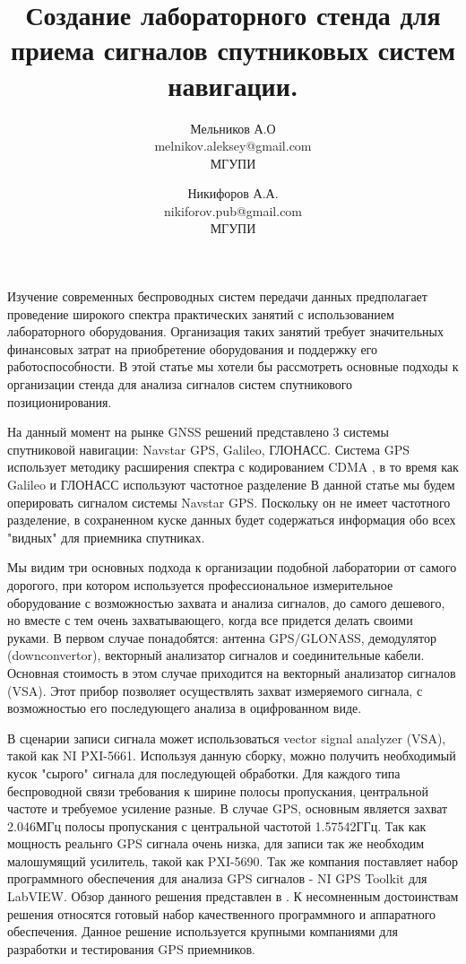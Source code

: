 \documentclass[a4paper,12pt]{article}
\numberwithin{table}{section}
\begin{document}
\title{Создание лабораторного стенда для приема сигналов спутниковых систем навигации.}
\author{Мельников А.О\\ melnikov.aleksey@gmail.com\\ МГУПИ \and Никифоров А.А.\\nikiforov.pub@gmail.com\\ МГУПИ}

\maketitle

Изучение современных беспроводных систем передачи данных предполагает проведение широкого спектра практических занятий с использованием лабораторного
оборудования.
Организация таких занятий требует значительных финансовых затрат на приобретение оборудования и поддержку его работоспособности. В этой статье мы хотели бы
рассмотреть основные подходы к организации стенда для анализа сигналов систем спутникового позиционирования.

На данный момент на рынке GNSS решений представлено 3 системы спутниковой навигации: Navstar GPS, Galileo, ГЛОНАСС. Система GPS использует методику
расширения спектра с кодированием CDMA \cite{gpsuserequipment}, в то время как Galileo и ГЛОНАСС используют частотное разделение \cite{galileo}
В данной статье мы будем оперировать
сигналом системы Navstar GPS. Поскольку он не имеет частотного разделение, в сохраненном куске данных будет содержаться информация обо всех "видных"
для приемника спутниках.
 
Мы видим три основных подхода к организации подобной лаборатории от самого дорогого, при котором используется профессиональное измерительное
оборудование с возможностью
захвата и анализа сигналов, до самого дешевого, но вместе с тем очень захватывающего, когда все придется делать своими руками.
В первом случае понадобятся: антенна GPS/GLONASS, демодулятор (downconvertor),
векторный анализатор сигналов и соединительные кабели. Основная стоимость в этом случае приходится на векторный анализатор сигналов (VSA).
Этот прибор позволяет осуществлять захват измеряемого сигнала, с возможностью его последующего анализа в оцифрованном виде.

В сценарии записи сигнала может использоваться vector signal analyzer (VSA), такой как NI PXI-5661.
Используя данную сборку, можно получить необходимый кусок "сырого" сигнала для последующей обработки.
Для каждого типа беспроводной связи требования к ширине полосы пропускания, центральной частоте и требуемое усиление разные. В
случае GPS, основным является захват 2.046МГц полосы пропускания с центральной частотой 1.57542ГГц.
Так как мощность реальнго GPS сигнала очень низка, для записи так же необходим малошумящий усилитель, такой как PXI-5690.
Так же компания поставляет набор программного обеспечения для анализа  GPS сигналов - NI GPS Toolkit для LabVIEW.
Обзор данного решения представлен в \cite{ni_vsa}.
К несомненным достоинствам решения относятся готовый набор качественного программного и аппаратного обеспечения.
Данное решение используется крупными компаниями для разработки и тестирования GPS приемников.
 
\end{document}

